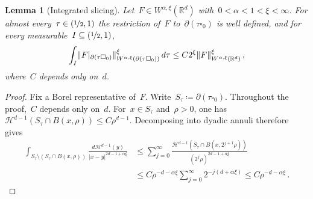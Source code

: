 \documentclass[11pt,letterpaper]{article}
\numberwithin{equation}{section}
\newtheorem{lemma}[theorem]{Lemma}
\theoremstyle{definition}
\newcommand{\Rd}{\mathbb{R}^d}
\newcommand{\nf}{\nicefrac}
\newcommand{\cu}{\square}
\DeclarePairedDelimiter{\norm}{\lVert}{\rVert}
\begin{document}
\begin{lemma}[Integrated slicing]
\label{l.fractional.slicing}
Let~$F\in W^{\alpha,\xi}(\Rd)$ with~$0<\alpha<1<\xi<\infty$. For almost every~$\tau\in(\nf12,1)$ the restriction of~$F$ to~$\partial(\tau\cu_0)$ is well defined, and for every measurable~$I\subseteq(\nf12,1)$,
\begin{equation}
    \label{e.boundary.slicing}
    \int_I
    \norm{F|_{\partial(\tau\cu_0)}}_{W^{\alpha,\xi}(\partial(\tau\cu_0))}^\xi
    \,d\tau
    \leq C2^\xi \norm{F}_{W^{\alpha,\xi}(\Rd)}^\xi
    \,,
\end{equation}
where~$C$ depends only on~$d$.
\end{lemma}
\begin{proof}
Fix a Borel representative of~$F$.
Write~$S_\tau\coloneqq\partial(\tau\cu_0)$.
Throughout the proof,~$C$ depends only on~$d$.
For~$x\in S_\tau$ and~$\rho>0$, one has
~$\mathcal H^{d-1}(S_\tau\cap B(x,\rho))\leq C\rho^{d-1}$.
Decomposing into dyadic annuli therefore gives
\begin{equation*}
    \begin{aligned}
        \int_{S_\tau\setminus(S_\tau\cap B(x,\rho))}
        \frac{d\mathcal H^{d-1}(y)}{|x-y|^{2d-1+\alpha\xi}}
        &\leq \sum_{j=0}^{\infty}
        \frac{\mathcal H^{d-1}(S_\tau\cap B(x,2^{j+1}\rho))}
             {(2^j\rho)^{2d-1+\alpha\xi}} \\
        &\leq C\rho^{-d-\alpha\xi}
        \sum_{j=0}^{\infty}2^{-j(d+\alpha\xi)}
        \leq C\rho^{-d-\alpha\xi}
        \,.
    \end{aligned}
\end{equation*}


\end{proof}
\end{document}
